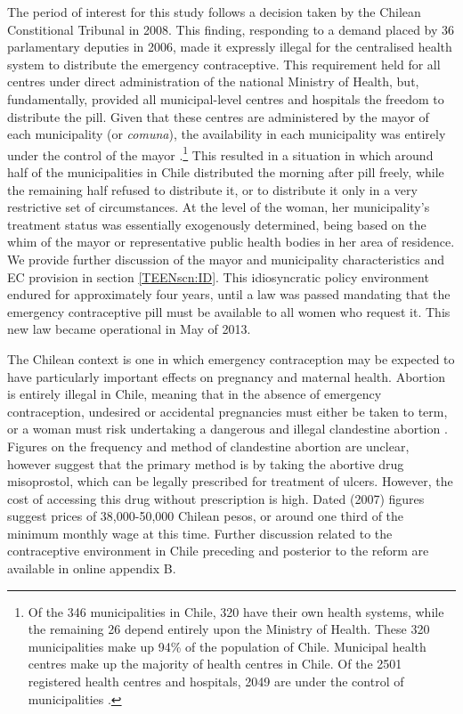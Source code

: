 The period of interest for this study follows a decision taken by the Chilean
Constitional Tribunal in 2008.  This finding, responding to a demand placed by
36 parlamentary deputies in 2006, made it expressly illegal for the centralised
health system to distribute the emergency contraceptive.  This requirement held
for all centres under direct administration of the national Ministry of Health,
but, fundamentally, provided all municipal-level centres and hospitals the 
freedom to distribute the pill.  Given that these centres are administered by 
the mayor of each municipality (or \emph{comuna}), the availability in each 
municipality was entirely under the control of the mayor \citep{Didesetal2011,
Didesetal2010,Didesetal2009}.\footnote{Of the 346 municipalities in Chile, 320
have their own health systems, while the remaining 26 depend entirely upon the
Ministry of Health.  These 320 municipalities make up 94\% of the population 
of Chile.  Municipal health centres make up the majority of health centres in 
Chile.  Of the 2501 registered health centres and hospitals, 2049 are under the
control of municipalities \citep{DEIS2013}.}  This resulted in a situation in
which around half of the municipalities in Chile distributed the morning after
pill freely, while the remaining half refused to distribute it, or to 
distribute it only in a very restrictive set of circumstances.  At the level
of the woman, her municipality's treatment status was essentially exogenously
determined, being based on the whim of the mayor or representative public 
health bodies in her area of residence.  We provide further discussion of the
mayor and municipality characteristics and EC provision in section 
\ref{TEENscn:ID}.  This idiosyncratic policy environment endured for 
approximately four years, until a law was passed mandating that the emergency 
contraceptive pill must be available to all women who request it.  This new 
law became operational in May of 2013.

The Chilean context is one in which emergency contraception may be expected to
have particularly important effects on pregnancy and maternal health.  Abortion
is entirely illegal in Chile, meaning that in the absence of emergency 
contraception, undesired or accidental pregnancies must either be taken to 
term, or a woman must risk undertaking a dangerous and illegal clandestine
abortion \citep{ShepardCasas2007}.  Figures on the frequency and method of 
clandestine abortion are unclear, however \citet{ShepardCasas2007} suggest that
the primary method is by taking the abortive drug misoprostol, which can be
legally prescribed for treatment of ulcers.  However, the cost of accessing 
this drug without prescription is high.  Dated (2007) figures suggest prices
of 38,000-50,000 Chilean pesos, or around one third of the minimum monthly wage
at this time.  Further discussion related to the contraceptive environment in 
Chile preceding and posterior to the reform are available in online appendix B.  

